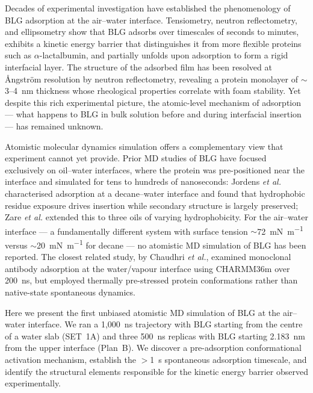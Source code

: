 \documentclass[journal=langd5,manuscript=article]{achemso}
\begin{document}
Decades of experimental investigation have established the phenomenology of BLG
adsorption at the air--water interface. Tensiometry, neutron reflectometry, and
ellipsometry show that BLG adsorbs over timescales of seconds to minutes,
exhibits a kinetic energy barrier that distinguishes it from more flexible
proteins such as $\alpha$-lactalbumin, and partially unfolds upon adsorption
to form a rigid interfacial layer.\cite{Cornec1999,Ulaganathan2019,Foam4_2020}
The structure of the adsorbed film has been resolved at \r{A}ngstr\"{o}m
resolution by neutron reflectometry, revealing a protein monolayer of
$\sim$3--4~nm thickness whose rheological properties correlate with foam
stability.\cite{Ulaganathan2019,Foam4_2020} Yet despite this rich experimental
picture, the atomic-level mechanism of adsorption --- what happens to BLG in
bulk solution before and during interfacial insertion --- has remained unknown.

Atomistic molecular dynamics simulation offers a complementary view that
experiment cannot yet provide. Prior MD studies of BLG have focused
exclusively on oil--water interfaces, where the protein was pre-positioned
near the interface and simulated for tens to hundreds of nanoseconds:
Jordens \textit{et al.}\cite{Jordens2015} characterised adsorption at a
decane--water interface and found that hydrophobic residue exposure drives
insertion while secondary structure is largely preserved; Zare \textit{et al.}\cite{Zare2016}
extended this to three oils of varying hydrophobicity. For the air--water
interface --- a fundamentally different system with surface tension
$\sim$\SI{72}{\milli\newton\per\metre} versus $\sim$\SI{20}{\milli\newton\per\metre}
for decane --- no atomistic MD simulation of BLG has been reported.
The closest related study, by Chaudhri \textit{et al.},\cite{Chaudhri2024}
examined monoclonal antibody adsorption at the water/vapour interface using
CHARMM36m over 200~ns, but employed thermally pre-stressed protein conformations
rather than native-state spontaneous dynamics.

Here we present the first unbiased atomistic MD simulation of BLG at the
air--water interface. We ran a 1{,}000~ns trajectory with BLG starting from
the centre of a water slab (SET~1A) and three 500~ns replicas with BLG starting
2.183~nm from the upper interface (Plan~B). We discover a pre-adsorption
conformational activation mechanism, establish the $>$1~\textmu{}s spontaneous
adsorption timescale, and identify the structural elements responsible for the
kinetic energy barrier observed experimentally.
\end{document}
